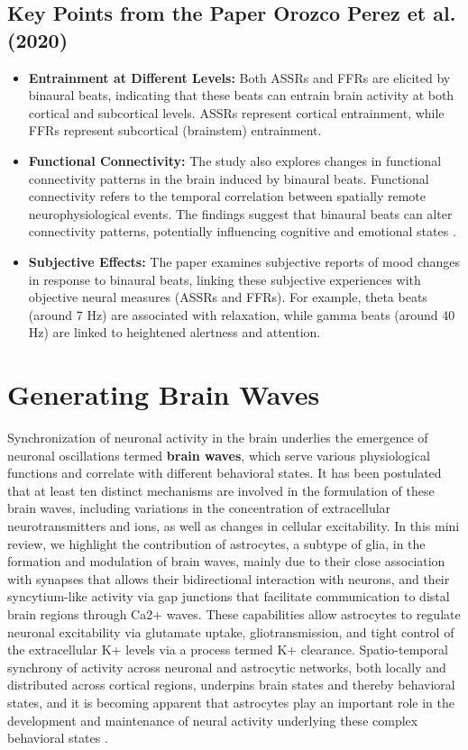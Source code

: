 \documentclass{article}
\begin{document}
\subsection{Key Points from the Paper Orozco Perez et al. (2020)}
\begin{itemize}
    \item \textbf{Entrainment at Different Levels:} Both ASSRs and FFRs are elicited by binaural beats, indicating that these beats can entrain brain activity at both cortical and subcortical levels. ASSRs represent cortical entrainment, while FFRs represent subcortical (brainstem) entrainment.
    \item \textbf{Functional Connectivity:} The study also explores changes in functional connectivity patterns in the brain induced by binaural beats. Functional connectivity refers to the temporal correlation between spatially remote neurophysiological events. The findings suggest that binaural beats can alter connectivity patterns, potentially influencing cognitive and emotional states \citep{orozco2020}.
    \item \textbf{Subjective Effects:} The paper examines subjective reports of mood changes in response to binaural beats, linking these subjective experiences with objective neural measures (ASSRs and FFRs). For example, theta beats (around 7 Hz) are associated with relaxation, while gamma beats (around 40 Hz) are linked to heightened alertness and attention.
\end{itemize}

\section{Generating Brain Waves}

Synchronization of neuronal activity in the brain underlies the emergence of neuronal oscillations termed \textbf{brain waves}, which serve various physiological functions and correlate with different behavioral states. It has been postulated that at least ten distinct mechanisms are involved in the formulation of these brain waves, including variations in the concentration of extracellular neurotransmitters and ions, as well as changes in cellular excitability. In this mini review, we highlight the contribution of astrocytes, a subtype of glia, in the formation and modulation of brain waves, mainly due to their close association with synapses that allows their bidirectional interaction with neurons, and their syncytium-like activity via gap junctions that facilitate communication to distal brain regions through Ca2+ waves. These capabilities allow astrocytes to regulate neuronal excitability via glutamate uptake, gliotransmission, and tight control of the extracellular K+ levels via a process termed K+ clearance. Spatio-temporal synchrony of activity across neuronal and astrocytic networks, both locally and distributed across cortical regions, underpins brain states and thereby behavioral states, and it is becoming apparent that astrocytes play an important role in the development and maintenance of neural activity underlying these complex behavioral states \citep{Buskila2019}.
\end{document}
